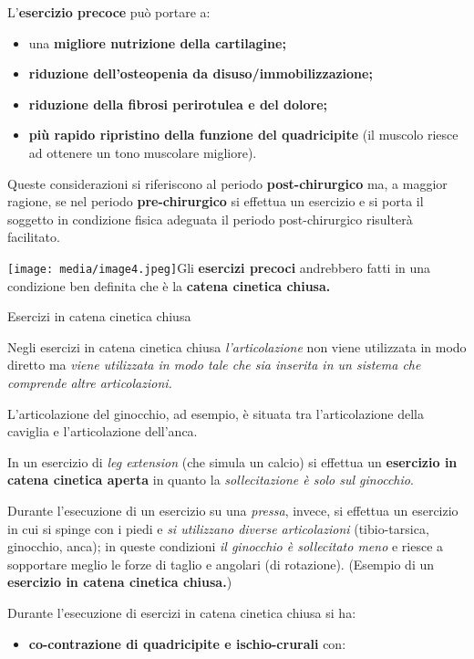 \documentclass[]{article}
\begin{document}
L'\textbf{esercizio precoce} può portare a:

\begin{itemize}
\item
  una \textbf{migliore nutrizione della cartilagine;}
\item
  \textbf{riduzione dell'osteopenia da disuso/immobilizzazione;}
\item
  \textbf{riduzione della fibrosi perirotulea e del dolore;}
\item
  \textbf{più rapido ripristino della funzione del quadricipite} (il
  muscolo riesce ad ottenere un tono muscolare migliore).
\end{itemize}

Queste considerazioni si riferiscono al periodo \textbf{post-chirurgico}
ma, a maggior ragione, se nel periodo \textbf{pre-chirurgico} si
effettua un esercizio e si porta il soggetto in condizione fisica
adeguata il periodo post-chirurgico risulterà facilitato.

\texttt{[image: media/image4.jpeg]}Gli
\textbf{esercizi precoci} andrebbero fatti in una condizione ben
definita che è la \textbf{catena cinetica chiusa.}

Esercizi in catena cinetica chiusa

Negli esercizi in catena cinetica chiusa \emph{l'articolazione} non
viene utilizzata in modo diretto ma \emph{viene utilizzata in modo tale
che sia inserita in un sistema che comprende altre articolazioni. }

L'articolazione del ginocchio, ad esempio, è situata tra l'articolazione
della caviglia e l'articolazione dell'anca.

In un esercizio di \emph{leg extension} (che simula un calcio) si
effettua un \textbf{esercizio in catena cinetica aperta} in quanto la
\emph{sollecitazione è solo sul ginocchio}.

Durante l'esecuzione di un esercizio su una \emph{pressa}, invece, si
effettua un esercizio in cui si spinge con i piedi e \emph{si utilizzano
diverse articolazioni} (tibio-tarsica, ginocchio, anca); in queste
condizioni \emph{il ginocchio è sollecitato meno} e riesce a sopportare
meglio le forze di taglio e angolari (di rotazione). (Esempio di un
\textbf{esercizio in catena cinetica chiusa.})

Durante l'esecuzione di esercizi in catena cinetica chiusa si ha:

\begin{itemize}
\item
  \textbf{co-contrazione di quadricipite e ischio-crurali} con:
\end{itemize}
\end{document}

